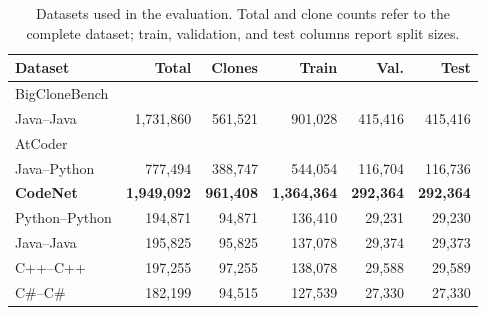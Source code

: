 \documentclass[final,5p,times,twocolumn]{elsarticle}
\theoremstyle{plain}
\begin{document}
\begin{table}[!htbp]
\centering
\caption{Datasets used in the evaluation. Total and clone counts refer to the complete dataset; train, validation, and test columns report split sizes.}
\label{tab:datasets}

\scriptsize
\renewcommand{\arraystretch}{1.08}
\setlength{\tabcolsep}{2.2pt}

\begin{tabularx}{\columnwidth}{@{}X r r r r r@{}}
\toprule
Dataset & Total & Clones & Train & Val. & Test \\
\midrule

BigCloneBench\cite{svajlenko2014bigclonebench, wang2020faast}
&

&

&

&

&

\\

\quad Java--Java
&
1,731,860
&
561,521
&
901,028
&
415,416
&
415,416
\\

\midrule

AtCoder~\cite{perez2019crosslang}
&

&

&

&

&

\\

\quad Java--Python
&
777,494
&
388,747
&
544,054
&
116,704
&
116,736
\\

\midrule

\textbf{CodeNet}~\cite{puri2021codenet}
&
\textbf{1,949,092}
&
\textbf{961,408}
&
\textbf{1,364,364}
&
\textbf{292,364}
&
\textbf{292,364}
\\

\addlinespace[1pt]

\quad Python--Python
&
194,871
&
94,871
&
136,410
&
29,231
&
29,230
\\

\quad Java--Java
&
195,825
&
95,825
&
137,078
&
29,374
&
29,373
\\

\quad C++--C++
&
197,255
&
97,255
&
138,078
&
29,588
&
29,589
\\

\quad C\#--C\#
&
182,199
&
94,515
&
127,539
&
27,330
&
27,330
\\


\end{tabularx}
\end{table}
\end{document}
